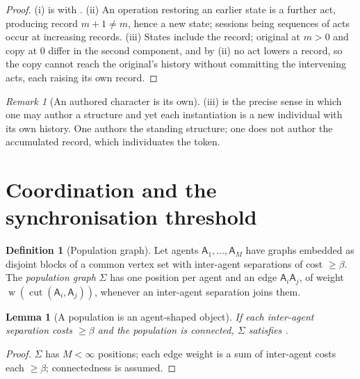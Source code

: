 \documentclass[11pt,a4paper]{article}
\theoremstyle{clstyle}
\newtheorem{lemma}[theorem]{Lemma}
\theoremstyle{definition}
\newtheorem{definition}[theorem]{Definition}
\theoremstyle{remark}
\newtheorem{remark}[theorem]{Remark}
\DeclareMathOperator{\wt}{w}
\DeclareMathOperator{\cut}{cut}
\newcommand{\flo}{\beta}
\newcommand{\Ag}{\mathsf{A}}
\newcommand{\Sig}{\Sigma}
\newcommand{\rec}{m}
\begin{document}
\begin{proof}
(i) is  with . (ii) An operation
restoring an earlier state is a further act, producing record $\rec+1\neq
\rec$, hence a new state; sessions being sequences of acts occur at
increasing records. (iii) States include the record; original at $\rec>0$ and
copy at $0$ differ in the second component, and by (ii) no act lowers a
record, so the copy cannot reach the original's history without committing
the intervening acts, each raising its own record.
\end{proof}

\begin{remark}[An authored character is its own]
\label{rem:copy}
(iii) is the precise sense in which one may author a
structure and yet each instantiation is a new individual with its own
history. One authors the standing structure; one does not author the
accumulated record, which individuates the token.
\end{remark}

\section{Coordination and the synchronisation threshold}
\label{sec:society}

\begin{definition}[Population graph]
\label{def:society}
Let agents $\Ag_1,\dots,\Ag_M$ have graphs embedded as disjoint blocks of a
common vertex set with inter-agent separations of cost $\ge\flo$. The
\emph{population graph} $\Sig$ has one position per agent and an edge
$\Ag_i\Ag_j$, of weight $\wt(\cut(\Ag_i,\Ag_j))$, whenever an inter-agent
separation joins them.
\end{definition}

\begin{lemma}[A population is an agent-shaped object]
\label{lem:society}
If each inter-agent separation costs $\ge\flo$ and the population is
connected, $\Sig$ satisfies .
\end{lemma}

\begin{proof}
$\Sig$ has $M<\infty$ positions; each edge weight is a sum of inter-agent
costs each $\ge\flo$; connectedness is assumed.
\end{proof}
\end{document}
